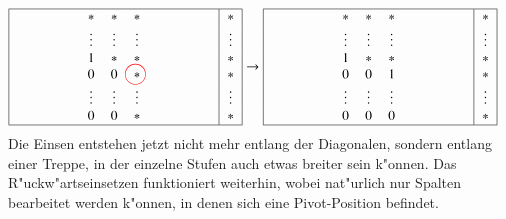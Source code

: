 \begin{align*}
\begin{tabular}{| >{$}c<{$} >{$}c<{$} >{$}c<{$} >{$}c<{$} >{$}c<{$} | >{$}c<{$} |}
\hline
\qquad\qquad &*     &*     &*     &\qquad\qquad&*     \\
       &\vdots&\vdots&\vdots&      &\vdots\\
       &1     &*     &*     &      &*     \\
       &0     &0     &*
\begin{picture}(0,0)
\color{red}\put(-3.5,3){\circle{15}}
\end{picture}
                            &      &*     \\
       &\vdots&\vdots&\vdots&      &\vdots\\
       &0     &0     &*     &      &*     \\
\hline
\end{tabular}
&\rightarrow
\begin{tabular}{| >{$}c<{$} >{$}c<{$} >{$}c<{$} >{$}c<{$} >{$}c<{$} | >{$}c<{$} |}
\hline
\qquad\qquad&*     &*     &*     &\qquad\qquad&*     \\
            &\vdots&\vdots&\vdots&            &\vdots\\
            &1     &*     &*     &            &*     \\
            &0     &0     &1     &            &*     \\
            &\vdots&\vdots&\vdots&            &\vdots\\
            &0     &0     &0     &            &*     \\
\hline
\end{tabular}
\end{align*}
Die Einsen entstehen jetzt nicht mehr entlang der Diagonalen, sondern
entlang einer Treppe, in der einzelne Stufen auch etwas breiter sein k"onnen.
Das R"uckw"artseinsetzen funktioniert weiterhin, wobei nat"urlich nur
Spalten bearbeitet werden k"onnen, in denen sich eine Pivot-Position
befindet.

